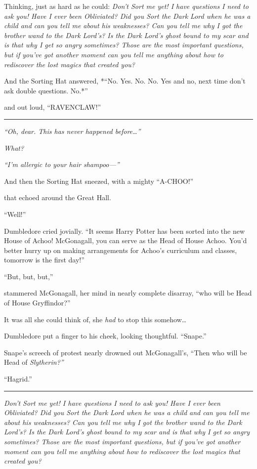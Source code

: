 Thinking, just as hard as he could: \emph{Don't Sort me yet! I have
questions I need to ask you! Have I ever been Obliviated? Did you Sort
the Dark Lord when he was a child and can you tell me about his
weaknesses? Can you tell me why I got the brother wand to the Dark
Lord's? Is the Dark Lord's ghost bound to my scar and is that why I get
so angry sometimes? Those are the most important questions, but if
you've got another moment can you tell me anything about how to
rediscover the lost magics that created you?}

And the Sorting Hat answered, *``No. Yes. No. No. Yes and no, next time
don't ask double questions. No.*''

and out loud, ``RAVENCLAW!''

\begin{center}\rule{3in}{0.4pt}\end{center}

\emph{``Oh, dear. This has never happened before\ldots{}''}

\emph{What?}

\emph{``I'm allergic to your hair shampoo---''}

And then the Sorting Hat sneezed, with a mighty ``A-CHOO!''

that echoed around the Great Hall.

``Well!''

Dumbledore cried jovially. ``It seems Harry Potter has been sorted into
the new House of Achoo! McGonagall, you can serve as the Head of House
Achoo. You'd better hurry up on making arrangements for Achoo's
curriculum and classes, tomorrow is the first day!''

``But, but, but,''

stammered McGonagall, her mind in nearly complete disarray, ``who will
be Head of House Gryffindor?''

It was all she could think of, she \emph{had} to stop this
somehow\ldots{}

Dumbledore put a finger to his cheek, looking thoughtful. ``Snape.''

Snape's screech of protest nearly drowned out McGonagall's, ``Then who
will be Head of \emph{Slytherin?''}

``Hagrid.''

\begin{center}\rule{3in}{0.4pt}\end{center}

\emph{Don't Sort me yet! I have questions I need to ask you! Have I ever
been Obliviated? Did you Sort the Dark Lord when he was a child and can
you tell me about his weaknesses? Can you tell me why I got the brother
wand to the Dark Lord's? Is the Dark Lord's ghost bound to my scar and
is that why I get so angry sometimes? Those are the most important
questions, but if you've got another moment can you tell me anything
about how to rediscover the lost magics that created you?}

